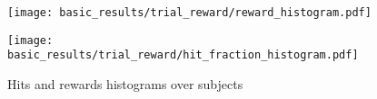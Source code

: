 \documentclass[../main.tex]{subfiles}
\begin{document}



\begin{figure}
    \centering
    \begin{minipage}{0.49\textwidth}
        \texttt{[image: basic\_results/trial\_reward/reward\_histogram.pdf]}
        \subcaption{}
    \end{minipage}
    \begin{minipage}{0.49\textwidth}
        \texttt{[image: basic\_results/trial\_reward/hit\_fraction\_histogram.pdf]}
      \subcaption{}
    \end{minipage}
    \caption[Hit and reward histograms]{Hits and rewards histograms over subjects}\label{fig:reward_histograms}
\end{figure}
\end{document}
